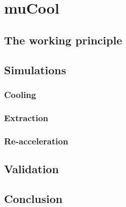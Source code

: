 \chapter{muCool}
\begin{refsection}

\section{The working principle}
\section{Simulations}
\subsection{Cooling}
\subsection{Extraction}
\subsection{Re-acceleration}
\section{Validation}

\section{Conclusion}


\cite{muCool:Taqqu:2006} \cite{muCool:Bao:2014} \cite{muCool:Andreas:2015} \cite{muCool:2018} \cite{muCool:2019} \cite{muCool:Angela:2019} \cite{muCool:2020}


\end{refsection}